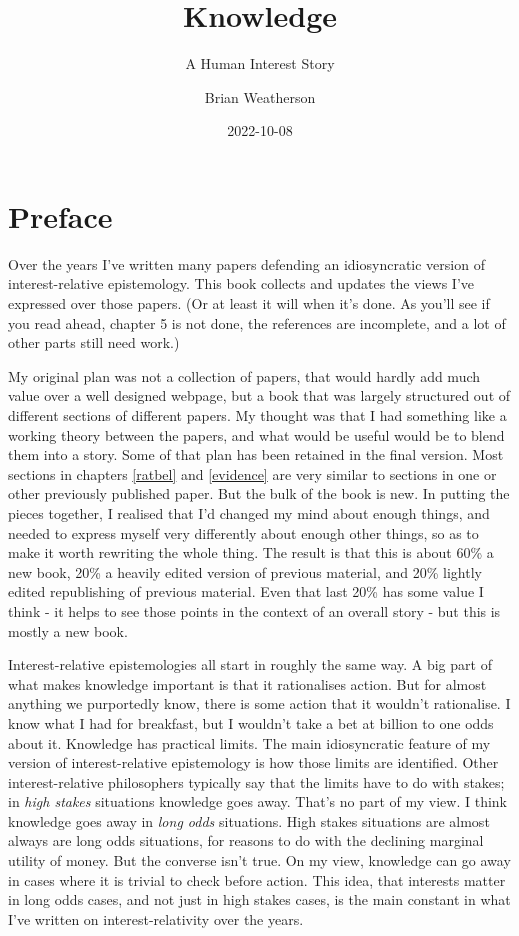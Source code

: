 \documentclass[
  11pt,
]{book}
\title{Knowledge}
\subtitle{A Human Interest Story}
\author{Brian Weatherson}
\date{2022-10-08}
\begin{document}
\maketitle

{
\setcounter{tocdepth}{1}
\tableofcontents
}
\hypertarget{Preface}{%
\chapter*{Preface}\label{Preface}}

\fancyhf{}
\fancyhead[R]{\thepage}

Over the years I've written many papers defending an idiosyncratic version of interest-relative epistemology. This book collects and updates the views I've expressed over those papers. (Or at least it will when it's done. As you'll see if you read ahead, chapter 5 is not done, the references are incomplete, and a lot of other parts still need work.)

My original plan was not a collection of papers, that would hardly add much value over a well designed webpage, but a book that was largely structured out of different sections of different papers. My thought was that I had something like a working theory between the papers, and what would be useful would be to blend them into a story. Some of that plan has been retained in the final version. Most sections in chapters \ref{ratbel} and \ref{evidence} are very similar to sections in one or other previously published paper. But the bulk of the book is new. In putting the pieces together, I realised that I'd changed my mind about enough things, and needed to express myself very differently about enough other things, so as to make it worth rewriting the whole thing. The result is that this is about 60\% a new book, 20\% a heavily edited version of previous material, and 20\% lightly edited republishing of previous material. Even that last 20\% has some value I think - it helps to see those points in the context of an overall story - but this is mostly a new book.

Interest-relative epistemologies all start in roughly the same way. A big part of what makes knowledge important is that it rationalises action. But for almost anything we purportedly know, there is some action that it wouldn't rationalise. I know what I had for breakfast, but I wouldn't take a bet at billion to one odds about it. Knowledge has practical limits. The main idiosyncratic feature of my version of interest-relative epistemology is how those limits are identified. Other interest-relative philosophers typically say that the limits have to do with stakes; in \emph{high stakes} situations knowledge goes away. That's no part of my view. I think knowledge goes away in \emph{long odds} situations. High stakes situations are almost always are long odds situations, for reasons to do with the declining marginal utility of money. But the converse isn't true. On my view, knowledge can go away in cases where it is trivial to check before action. This idea, that interests matter in long odds cases, and not just in high stakes cases, is the main constant in what I've written on interest-relativity over the years.
\end{document}
